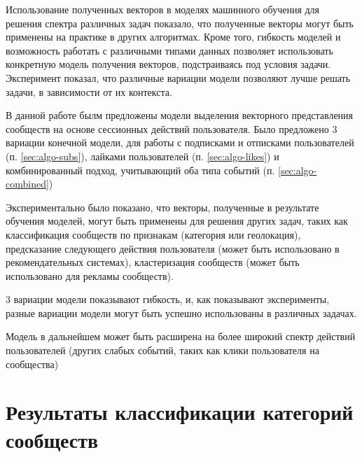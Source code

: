 \documentclass[times,specification,annotation]{itmo-student-thesis}
\begin{document}
Использование полученных векторов в моделях машинного обучения для решения спектра различных задач показало, что полученные векторы могут быть применены на практике в других алгоритмах. Кроме того, гибкость моделей и возможность работать с различными типами данных позволяет использовать конкретную модель получения векторов, подстраиваясь под условия задачи. Эксперимент показал, что различные вариации модели позволяют лучше решать задачи, в зависимости от их контекста. 


\startconclusionpage

В данной работе былм предложены модели выделения векторного представления сообществ на основе сессионных действий пользователя. Было предложено 3 вариации конечной модели, для работы с подписками и отписками пользователей (п. \ref{sec:algo-subs}), лайками пользователей (п. \ref{sec:algo-likes}) и комбинированный подход, учитывающий оба типа событий (п. \ref{sec:algo-combined})

Экспериментально было показано, что векторы, полученные в результате обучения моделей, могут быть применены для решения других задач, таких как классификация сообществ по признакам (категория или геолокация), предсказание следующего действия пользователя (может быть использовано в рекомендательных системах), кластеризация сообществ (может быть использовано для рекламы сообществ).

3 вариации модели показывают гибкость, и, как показывают эксперименты, разные вариации модели могут быть успешно использованы в различных задачах. 

Модель в дальнейшем может быть расширена на более широкий спектр действий пользователей (других слабых событий, таких как клики пользователя на сообщества) 

\printmainbibliography

\appendix

\chapter{Результаты классификации категорий сообществ}\label{app}
\end{document}
